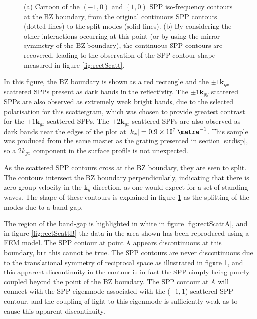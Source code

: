 \begin{figure}
\begin{center}
\end{center}
\caption[Cartoon of the $(-1,0)$ and $(1,0)$ SPP iso-frequency contours at the BZ boundary.]{(a) Cartoon of the $(-1,0)$ and $(1,0)$ SPP iso-frequency contours at the BZ boundary, from the original continuous SPP contours (dotted lines) to the split modes (solid lines). (b) By considering the other interactions occurring at this point (or by using the mirror symmetry of the BZ boundary), the continuous SPP contours are recovered, leading to the observation of the SPP contour shape measured in figure \ref{fig:rectScatt}. \label{fig:rect-exaplain-bandshape-cartoon}}
\end{figure}

In this figure, the BZ boundary is shown as a red rectangle and the $\pm 1\mathbf{k}_{gx}$ scattered SPPs present as dark bands in the reflectivity. The $\pm 1\mathbf{k}_{gy}$ scattered SPPs are also observed as extremely weak bright bands, due to the selected polarisation for this scattergram, which was chosen to provide greatest contrast for the $\pm 1\mathbf{k}_{gx}$ scattered SPPs. The $\pm 2\mathbf{k}_{gx}$ scattered SPPs are also observed as dark bands near the edges of the plot at $|k_x|=0.9\times 10^{7} \:\metre^{-1}$. This sample was produced from the same master as the grating presented in section \ref{s:rdisp}, so a $2k_{gx}$ component in the surface profile is not unexpected. 

As the scattered SPP contours cross at the BZ boundary, they are seen to split. The contours intersect the BZ boundary perpendicularly, indicating that there is zero group velocity in the $\mathbf{k}_y$ direction, as one would expect for a set of standing waves. The shape of these contours is explained in figure \ref{fig:rect-exaplain-bandshape-cartoon} as the splitting of the modes due to a band-gap. 

The region of the band-gap is highlighted in white in figure \ref{fig:rectScattA}, and in figure \ref{fig:rectScattB} the data in the area shown has been reproduced using a FEM model. The SPP contour at point A appears discontinuous at this boundary, but this cannot be true. The SPP contours are never discontinuous due to the translational symmetry of reciprocal space as illustrated in figure \ref{fig:rect-exaplain-bandshape-cartoon}, and this apparent discontinuity in the contour is in fact the SPP simply being poorly coupled beyond the point of the BZ boundary. The SPP contour at A will connect with the SPP eigenmode associated with the ($-1,1$) scattered SPP contour, and the coupling of light to this eigenmode is sufficiently weak as to cause this apparent discontinuity.

